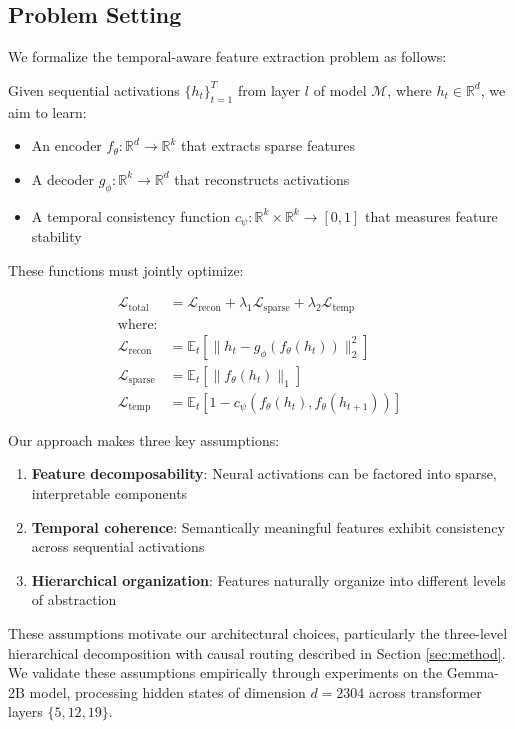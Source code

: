 \documentclass{article} %
\begin{document}
\subsection{Problem Setting}
\label{subsec:problem}

We formalize the temporal-aware feature extraction problem as follows:

Given sequential activations $\{h_t\}_{t=1}^T$ from layer $l$ of model $\mathcal{M}$, where $h_t \in \mathbb{R}^d$, we aim to learn:

\begin{itemize}
\item An encoder $f_\theta: \mathbb{R}^d \rightarrow \mathbb{R}^k$ that extracts sparse features
\item A decoder $g_\phi: \mathbb{R}^k \rightarrow \mathbb{R}^d$ that reconstructs activations
\item A temporal consistency function $c_\psi: \mathbb{R}^k \times \mathbb{R}^k \rightarrow [0,1]$ that measures feature stability
\end{itemize}

These functions must jointly optimize:

\begin{align*}
\mathcal{L}_\text{total} &= \mathcal{L}_\text{recon} + \lambda_1\mathcal{L}_\text{sparse} + \lambda_2\mathcal{L}_\text{temp} \\
\text{where:}& \\
\mathcal{L}_\text{recon} &= \mathbb{E}_t[\|h_t - g_\phi(f_\theta(h_t))\|_2^2] \\
\mathcal{L}_\text{sparse} &= \mathbb{E}_t[\|f_\theta(h_t)\|_1] \\
\mathcal{L}_\text{temp} &= \mathbb{E}_t[1 - c_\psi(f_\theta(h_t), f_\theta(h_{t+1}))]
\end{align*}

Our approach makes three key assumptions:

\begin{enumerate}
\item \textbf{Feature decomposability}: Neural activations can be factored into sparse, interpretable components
\item \textbf{Temporal coherence}: Semantically meaningful features exhibit consistency across sequential activations
\item \textbf{Hierarchical organization}: Features naturally organize into different levels of abstraction
\end{enumerate}

These assumptions motivate our architectural choices, particularly the three-level hierarchical decomposition with causal routing described in Section \ref{sec:method}. We validate these assumptions empirically through experiments on the Gemma-2B model, processing hidden states of dimension $d=2304$ across transformer layers $\{5, 12, 19\}$.
\end{document}
